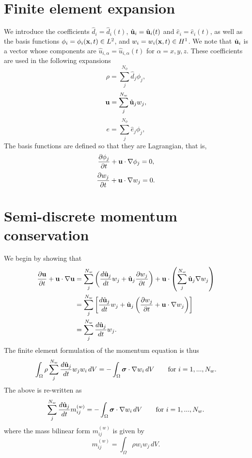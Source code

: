 \documentclass[11pt]{article}
\begin{document}
\section{Finite element expansion}
We introduce the coefficients $\hat{d}_i = \hat{d}_i(t)$, $\hat{\mathbf{u}}_i = \hat{\mathbf{u}}_i(t)$ and $\hat{e}_i = \hat{e}_i(t)$, as well as the basis functions $\phi_i = \phi_i(\mathbf{x},t) \in L^2$, and $w_i = w_i(\mathbf{x},t) \in H^1$. We note that $\hat{\mathbf{u}}_i$ is a vector whose components are $\hat{u}_{i,\alpha} = \hat{u}_{i,\alpha}(t)$ for $\alpha = x,y,z$. These coefficients are used in the following expansions
\begin{equation}
    \rho = \sum_j^{N_\phi} \hat{d}_j \phi_j,
\end{equation}
\begin{equation}
    \mathbf{u} = \sum_j^{N_w} \hat{\mathbf{u}}_j w_j,
\end{equation}
\begin{equation}
    e = \sum_j^{N_\phi} \hat{e}_j \phi_j,
\end{equation}
The basis functions are defined so that they are Lagrangian, that is,
\begin{equation}
    \frac{\partial \phi_j}{\partial t} + \mathbf{u} \cdot \nabla \phi_j = 0,
\end{equation}
\begin{equation}
    \frac{\partial w_j}{\partial t} + \mathbf{u} \cdot \nabla w_j = 0.
\end{equation}

\section{Semi-discrete momentum conservation}
We begin by showing that
\begin{align}
    \frac{\partial \mathbf{u}}{\partial t} + \mathbf{u} \cdot \nabla \mathbf{u} &= \sum_j^{N_w} \left ( \frac{d \hat{\mathbf{u}}_j}{d t} w_j + \hat{\mathbf{u}}_j \frac{\partial w_j}{\partial t} \right ) + \mathbf{u} \cdot \left ( \sum_j^{N_w} \hat{\mathbf{u}}_j \nabla w_j \right ) \nonumber \\
    &= \sum_j^{N_w} \left [ \frac{d \hat{\mathbf{u}}_j}{d t} w_j + \hat{\mathbf{u}}_j \left ( \frac{\partial w_j}{\partial t} + \mathbf{u} \cdot \nabla w_j \right ) \right ] \nonumber \\
    &= \sum_j^{N_w} \frac{d \hat{\mathbf{u}}_j}{d t} w_j.
\end{align}
The finite element formulation of the momentum equation is thus 
\begin{equation}
    \int_\Omega \rho \sum_j^{N_w} \frac{d \hat{\mathbf{u}}_j}{d t} w_j w_i \, dV = -\int_\Omega \bm \sigma \cdot \nabla w_i \, dV \qquad \text{for } i = 1,...,N_w.
\end{equation}
The above is re-written as
\begin{equation}
    \label{eq:semi_discrete_momentum_bilinear}
    \sum_j^{N_w} \frac{d \hat{\mathbf{u}}_j}{d t} m^{(w)}_{ij} = -\int_\Omega \bm \sigma \cdot \nabla w_i \, dV \qquad \text{for } i = 1,...,N_w.
\end{equation}
where the mass bilinear form $m^{(w)}_{ij}$ is given by 
\begin{equation}
    m^{(w)}_{ij} = \int_\Omega \rho w_i w_j \, dV.
\end{equation}
\end{document}
